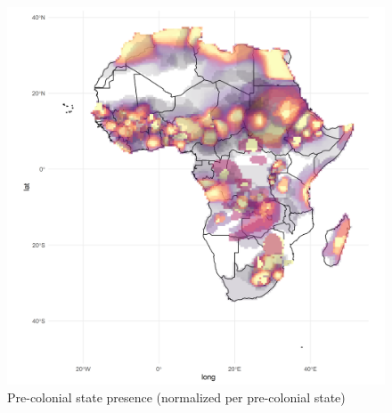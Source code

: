 %

\begin{figure}[hbpt]
	\centering
	\includegraphics[width=\textwidth]{img/geo_isd_all.png}
	\caption{Pre-colonial state presence (normalized per pre-colonial state)}
	\label{spnorm}
\end{figure}


